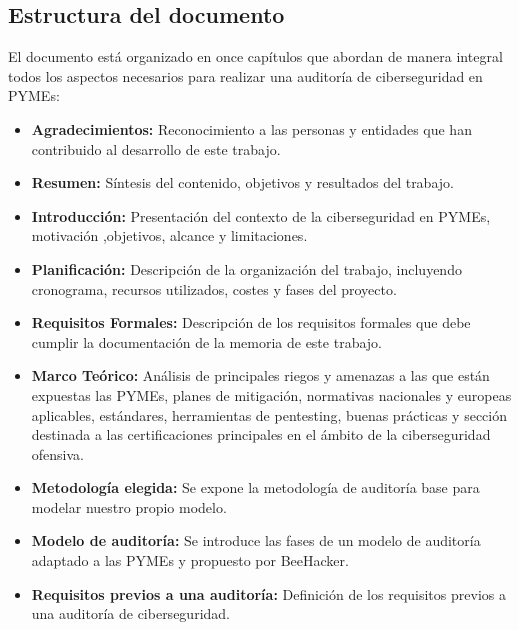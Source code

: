 \documentclass[a4paper, 11pt]{article}
\begin{document}
\subsection{Estructura del documento}
\par\vspace{0.5cm}

El documento está organizado en once capítulos que abordan de manera integral todos los aspectos necesarios para realizar una auditoría de ciberseguridad en PYMEs:

\begin{itemize}
    \item \textbf{Agradecimientos:} Reconocimiento a las personas y entidades que han contribuido al desarrollo de este trabajo.
    
    \item \textbf{Resumen:} Síntesis del contenido, objetivos y resultados del trabajo.
    
    \item \textbf{Introducción:} Presentación del contexto de la ciberseguridad en PYMEs, motivación ,objetivos, alcance y limitaciones.
    
    \item \textbf{Planificación:} Descripción de la organización del trabajo, incluyendo cronograma, recursos utilizados, costes y fases del proyecto.
    
    
    \item \textbf{Requisitos Formales:} Descripción de los requisitos formales que debe cumplir la documentación de la memoria de este trabajo.
    
    \item \textbf{Marco Teórico:} Análisis de principales riegos y amenazas a las que están expuestas las PYMEs, planes de mitigación, normativas nacionales y europeas aplicables, estándares, herramientas de pentesting, buenas prácticas y sección destinada a las certificaciones principales en el ámbito de la ciberseguridad ofensiva.
    

    \item \textbf{Metodología elegida:} Se expone la metodología de auditoría base para modelar nuestro propio modelo.
    \item \textbf{Modelo de auditoría:} Se introduce las fases de un modelo de auditoría adaptado a las PYMEs y propuesto por BeeHacker.
    \item \textbf{Requisitos previos a una auditoría:} Definición de los requisitos previos a una auditoría de ciberseguridad.
    

\end{itemize}
\end{document}

